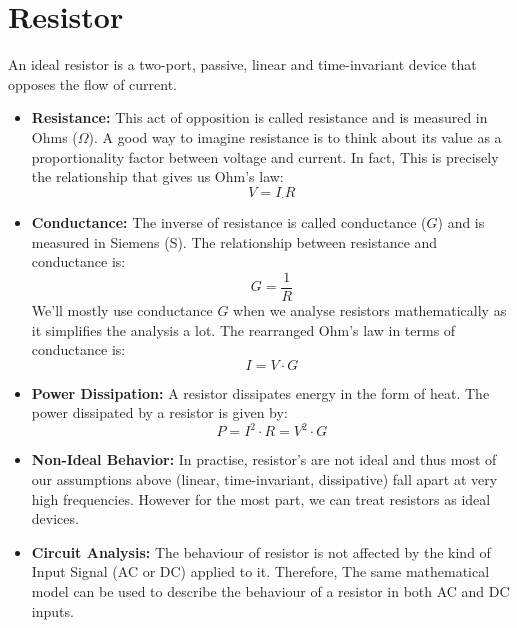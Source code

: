 \section{Resistor}
An ideal resistor is a two-port, passive, linear and time-invariant
device that opposes the flow of current.

\begin{itemize}
  \item \textbf{Resistance:}
    This act of opposition is called resistance and is measured in
    Ohms (\(\Omega\)). A good way to imagine resistance is to think
    about its value as a proportionality factor between voltage and
    current. In fact, This is precisely the relationship that gives
    us Ohm's law:
    \[
      V = I_ \cdot R
    \]
  \item \textbf{Conductance:}
    The inverse of resistance is called conductance (\(G\)) and is
    measured in Siemens (S). The relationship between resistance and
    conductance is:
    \[
      G = \frac{1}{R}
    \]
    We'll mostly use conductance \(G\) when we analyse resistors
    mathematically as it simplifies the analysis a lot. The rearranged
    Ohm's law in terms of conductance is:
    \[
      I = V \cdot G
    \]
  \item \textbf{Power Dissipation:}
    A resistor dissipates energy in the form of heat. The power
    dissipated by a resistor is given by:
    \[
      P = I^2 \cdot R = V^2 \cdot G
    \]
  \item \textbf{Non-Ideal Behavior:}
    In practise, resistor's are not ideal and thus most of our
    assumptions above (linear, time-invariant, dissipative) fall
    apart at very high frequencies. However for the most part,
    we can treat resistors as ideal devices.
  \item \textbf{Circuit Analysis:}
    The behaviour of resistor is not affected by the kind of Input
    Signal (AC or DC) applied to it. Therefore, The same mathematical
    model can be used to describe the behaviour of a resistor in both
    AC and DC inputs.
\end{itemize}
